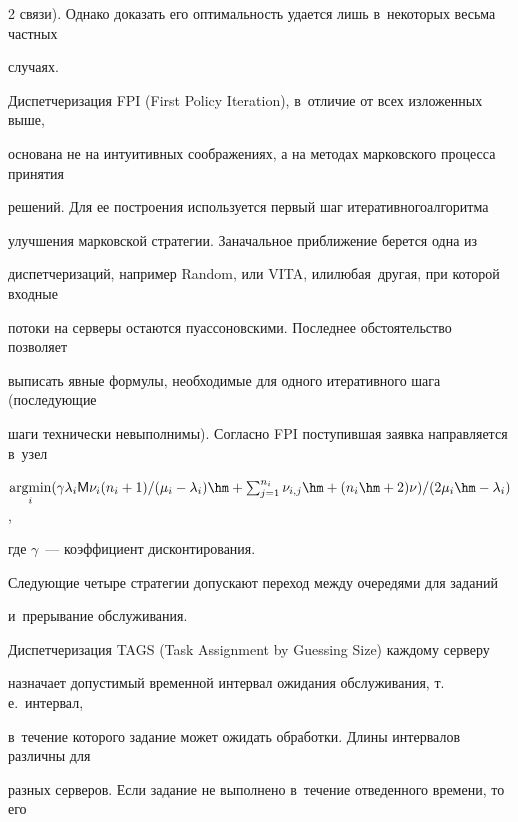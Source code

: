 \begin{multicols}{2}
связи). Однако доказать его оптимальность удается лишь в~некоторых весьма частных 


случаях.


    


    Диспетчеризация FPI (First Policy Iteration), в~отличие от всех изложенных выше, 


основана не на интуитивных соображениях, а на методах марковского процесса принятия 


решений. Для ее построения используется первый шаг итеративного\linebreak алгоритма 


улучшения марковской стратегии. За\linebreak начальное приближение берется одна из 


диспетчеризаций, например Random, или VITA, или\linebreak любая~дру\-гая, при которой входные 


потоки на серверы остаются пуассоновскими. Последнее об\-стоя\-тельство позволяет 


выписать явные формулы, необходимые для одного итеративного шага (по\-сле\-ду\-ющие 


шаги технически невыполнимы). Согласно FPI поступившая заявка направляется в~узел


    $\mathop{\mathrm{argmin}}\limits_i  


    (\gamma\lambda_i {\sf 


M}\nu_i(n_i+1)/(\mu_i-\lambda_i)\hm+\sum_{j=1}^{n_i} \nu_{i,j}\hm+ 


(n_i\hm+2)\nu)/(2\mu_i\hm-\lambda_i)$,


где $\gamma$~--- коэффициент дисконтирования.





    Следующие четыре стратегии допускают переход между очередями для заданий 


и~прерывание обслуживания.


    


    Диспетчеризация TAGS (Task Assignment by Guessing Size) каждому серверу 


назначает допустимый временной интервал ожидания обслуживания, т.\,е.\ интервал, 


в~течение которого задание может ожидать обработки. Длины интервалов различны для 


разных серверов. Если задание не выполнено в~течение отведенного времени, то его 



\end{multicols}
